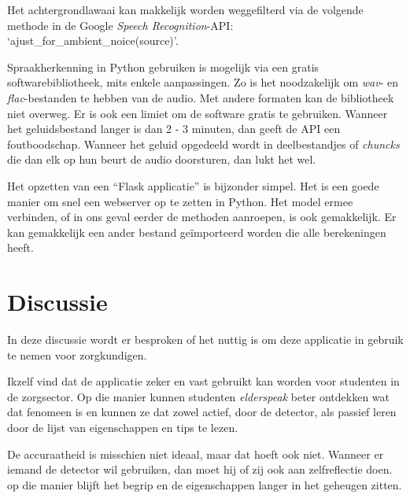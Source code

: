 Het achtergrondlawaai kan makkelijk worden weggefilterd via de volgende methode in de Google \textit{Speech Recognition}-API: `ajust\_for\_ambient\_noice(source)'.

Spraakherkenning in Python gebruiken is mogelijk via een gratis softwarebibliotheek, mits enkele aanpassingen. Zo is het noodzakelijk om \textit{wav}- en \textit{flac}-bestanden te hebben van de audio. Met andere formaten kan de bibliotheek niet overweg. Er is ook een limiet om de software gratis te gebruiken. Wanneer het geluidsbestand langer is dan 2 - 3 minuten, dan geeft de API een foutboodschap. Wanneer het geluid opgedeeld wordt in deelbestandjes of \textit{chuncks} die dan elk op hun beurt de audio doorsturen, dan lukt het wel.

Het opzetten van een ``Flask applicatie'' is bijzonder simpel. Het is een goede manier om snel een webserver op te zetten in Python. Het model ermee verbinden, of in ons geval eerder de methoden aanroepen, is ook gemakkelijk. Er kan gemakkelijk een ander bestand geïmporteerd worden die alle berekeningen heeft.

\section{Discussie}
In deze discussie wordt er besproken of het nuttig is om deze applicatie in gebruik te nemen voor zorgkundigen.

Ikzelf vind dat de applicatie zeker en vast gebruikt kan worden voor studenten in de zorgsector. Op die manier kunnen studenten \textit{elderspeak} beter ontdekken wat dat fenomeen is en kunnen ze dat zowel actief, door de detector, als passief leren door de lijst van eigenschappen en tips te lezen.

De accuraatheid is misschien niet ideaal, maar dat hoeft ook niet. Wanneer er iemand de detector wil gebruiken, dan moet hij of zij ook aan zelfreflectie doen. op die manier blijft het begrip en de eigenschappen langer in het geheugen zitten.